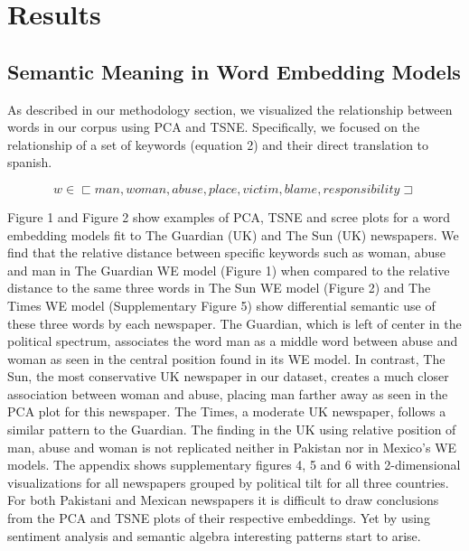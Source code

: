 \documentclass{article}
\begin{document}
\section{Results}{	
\subsection{Semantic Meaning in Word Embedding Models}{
	
As described in our methodology section, we visualized the relationship between words in our corpus using PCA and TSNE. Specifically, we focused on the relationship of a set of keywords (equation 2) and their direct translation to spanish. 

\begin{equation} \label{eu_eqn}
	w \in \sqsubset  {man, woman, abuse, place, victim, blame, responsibility} \sqsupset
\end{equation}

Figure 1 and Figure 2 show examples of PCA, TSNE and scree plots for a word embedding models fit to The Guardian (UK) and The Sun (UK) newspapers. We find that the relative distance between specific keywords such as woman, abuse and man in The Guardian WE model (Figure 1) when compared to the relative distance to the same three words in The Sun WE model (Figure 2) and The Times WE model (Supplementary Figure 5) show differential semantic use of these three words by each newspaper. The Guardian, which is left of center in the political spectrum, associates the word man as a middle word between abuse and woman as seen in the central position found in its WE model. In contrast, The Sun, the most conservative  UK newspaper in our dataset, creates a much closer association between woman and abuse, placing man farther away as seen in the PCA plot for this newspaper. The Times, a moderate UK newspaper, follows a similar pattern to the Guardian. The finding in the UK using relative position of man, abuse and woman is not replicated neither in Pakistan nor in Mexico’s WE models. The appendix shows supplementary figures 4, 5 and 6 with 2-dimensional visualizations for all newspapers grouped by political tilt for all three countries. For both Pakistani and Mexican newspapers it is difficult to draw conclusions from the PCA and TSNE plots of their respective embeddings. Yet by using sentiment analysis and semantic algebra interesting patterns start to arise. 

}}
\end{document}

